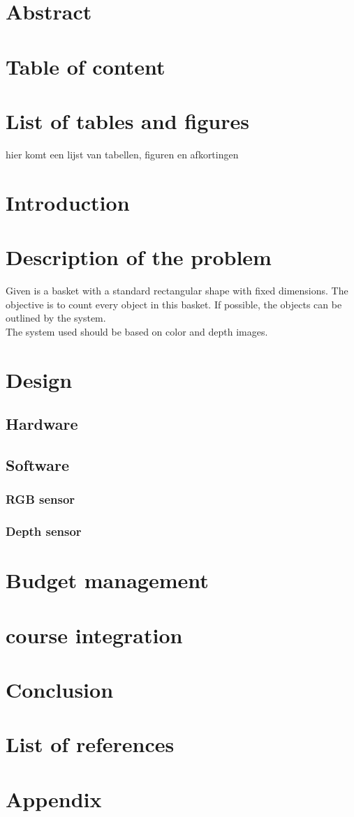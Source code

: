 \documentclass{article}
\begin{document}
\section{Abstract}
\section{Table of content}
\section{List of tables and figures}
hier komt een lijst van tabellen, figuren en afkortingen
\section{Introduction}

\section{Description of the problem}

\hspace{\parindent} Given is a basket with a standard rectangular shape with fixed dimensions. The objective is to count every object in this basket. If possible, the objects can be outlined by the system.\\

\noindent The system used should be based on color and depth images.


\section{Design}
\subsection{Hardware}
\subsection{Software}
\subsubsection{RGB sensor}
\subsubsection{Depth sensor}

\section{Budget management}
\section{course integration}
\section{Conclusion}
\section{List of references}
\section{Appendix}
\end{document}
